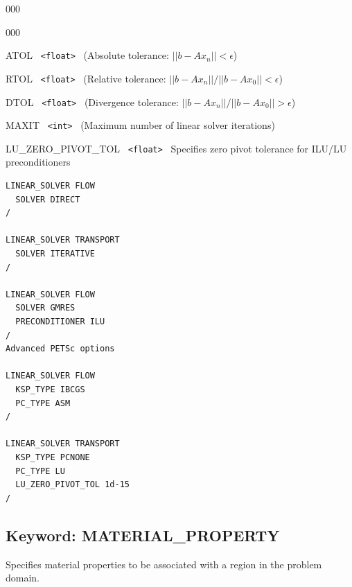 \begin{deflist}{000}
\begin{deflist}{000}
\item[ATOL] \ {\tt <float>} \ (Absolute tolerance: $||b-Ax_n|| < \epsilon$)
\item[RTOL] \ {\tt <float>} \ (Relative tolerance: $||b-Ax_n||/||b-Ax_0||<\epsilon$)
\item[DTOL] \ {\tt <float>} \ (Divergence tolerance: $||b-Ax_n||/||b-Ax_0||>\epsilon$)
\item[MAXIT] \ {\tt <int>} \ (Maximum number of linear solver iterations)
\item[LU\_ZERO\_PIVOT\_TOL] \ {\tt <float>} \ Specifies zero pivot tolerance for ILU/LU preconditioners

\end{deflist}
\item[\keyend]
\end{deflist}


\begin{mdframed}

\footnotesize
\begin{verbatim}
LINEAR_SOLVER FLOW
  SOLVER DIRECT
/

LINEAR_SOLVER TRANSPORT
  SOLVER ITERATIVE
/

LINEAR_SOLVER FLOW
  SOLVER GMRES
  PRECONDITIONER ILU
/
Advanced PETSc options

LINEAR_SOLVER FLOW
  KSP_TYPE IBCGS
  PC_TYPE ASM
/

LINEAR_SOLVER TRANSPORT
  KSP_TYPE PCNONE
  PC_TYPE LU
  LU_ZERO_PIVOT_TOL 1d-15
/
\end{verbatim}
\normalsize
\end{mdframed}

\hyperlink{target_key}{\return}


\newpage
\protect\hypertarget{target_mat}{}

\subsection{Keyword: MATERIAL\_PROPERTY}

\hfill\hyperlink{target_key}{\return}

 Specifies material properties to be associated with a region in the problem domain.

